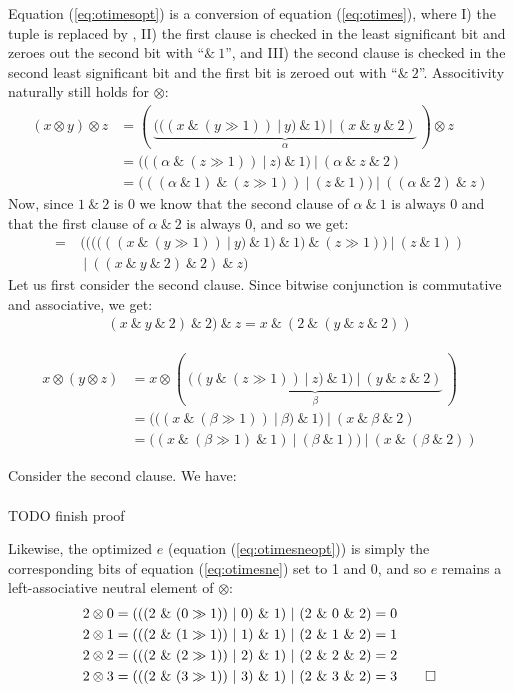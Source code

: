 Equation (\ref{eq:otimesopt}) is a conversion of equation (\ref{eq:otimes}), where I) the tuple is replaced by , II) the first clause is checked in the least significant bit and zeroes out the second bit with ``$\&~1$'', and III) the second clause is checked in the second least significant bit and the first bit is zeroed out with ``$\&~2$''. Associtivity naturally still holds for $\otimes$:
\begin{align}
  \label{eq:otimesproof}
  (x \otimes y) \otimes z &= (~\underbrace{(((x~\&~(y \gg 1))~|~y)~\&~1)~|~(x~\&~y~\&~2)}_{\alpha}~) \otimes z\\
              &= (((\alpha~\&~(z \gg 1))~|~z)~\&~1)~|~(\alpha~\&~z~\&~2)\\
              &= (((\alpha~\&~1)~\&~(z \gg 1))~|~(z~\&~1))~|~((\alpha~\&~2)~\&~z)
\end{align}
Now, since $1~\&~2$ is $0$ we know that the second clause of $\alpha~\&~1$ is always $0$ and that the first clause of $\alpha~\&~2$ is always $0$, and so we get: 
  \begin{align}
  \label{eq:otimesproof}
    =~&((((((x~\&~(y \gg 1))~|~y)~\&~1)~\&~1)~\&~(z \gg 1))~|~(z~\&~1))\\
      &~|~((x~\&~y~\&~2)~\&~2)~\&~z)
  \end{align}
Let us first consider the second clause. Since bitwise conjunction is commutative and associative, we get:
\begin{align}
\label{eq:otimesproof}
(x~\&~y~\&~2)~\&~2)~\&~z = x~\&~(2~\&~(y~\&~z~\&~2))
\end{align}

\begin{align}
\label{eq:otimesproof}
  x \otimes (y \otimes z) &= x \otimes (~\underbrace{((y~\&~(z \gg 1))~|~z)~\&~1)~|~(y~\&~z~\&~2)}_{\beta}~)\\
  &= (((x~\&~(\beta \gg 1))~|~\beta)~\&~1)~|~(x~\&~\beta~\&~2)\\
  &= ((x~\&~(\beta \gg 1)~\&~1)~|~(\beta~\&~1))~|~(x~\&~(\beta~\&~2))
\end{align}

Consider the second clause. We have:
\begin{align}
  \label{eq:3}
  
\end{align}


{\color{red} TODO finish proof}


Likewise, the optimized $e$ (equation (\ref{eq:otimesneopt})) is simply the corresponding bits of equation (\ref{eq:otimesne}) set to 1 and 0, and so $e$ remains a left-associative neutral element of $\otimes$:
\begin{align}
  \label{eq:otimesneproof}
  2 \otimes 0 &= (((2~\&~(0 \gg 1))~|~0)~\&~1)~|~(2~\&~0~\&~2) = 0 \\
  2 \otimes 1 &= (((2~\&~(1 \gg 1))~|~1)~\&~1)~|~(2~\&~1~\&~2) = 1 \\
  2 \otimes 2 &= (((2~\&~(2 \gg 1))~|~2)~\&~1)~|~(2~\&~2~\&~2) = 2 \\
  2 \otimes 3 &= (((2~\&~(3 \gg 1))~|~3)~\&~1)~|~(2~\&~3~\&~2) = 3 \qed
\end{align}

